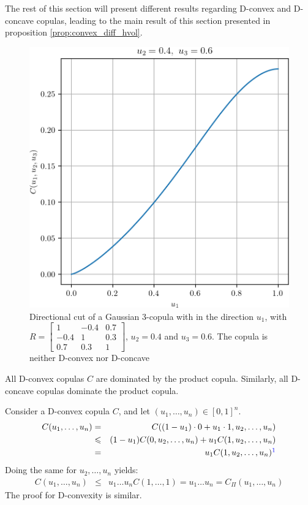 The rest of this section will present different results regarding D-convex and D-concave copulas, leading to the main result of this section presented in proposition \ref{prop:convex_diff_hvol}.

\begin{figure}
    \centering
    \includegraphics[width=0.5\linewidth]{Images/Chap_2/Gaussian_copula/gaussian_copula_n3.png}
    \caption{Directional cut of a Gaussian 3-copula with in the direction $u_1$, with $R=\begin{bmatrix} 1 & -0.4 & 0.7\\ -0.4 & 1 & 0.3\\ 0.7 & 0.3 & 1 \end{bmatrix}$, $u_2=0.4$ and $u_3=0.6$. The copula is neither D-convex nor D-concave}
    \label{fig:gaussian_copula_simu_n3}
\end{figure}

\begin{remark}
    All D-convex copulas $C$ are dominated by the product copula. Similarly, all D-concave copulas dominate the product copula.

    Consider a D-convex copula $C$, and let $(u_1, \dots, u_n)\in[0,1]^n$.
    \begin{eqnarray*}
        C(u_1,\dots, u_n) &=& C((1-u_1)\cdot0+u_1\cdot 1, u_2, \dots, u_n)\\
        &\leqslant& (1-u_1)C(0, u_2,\dots, u_n)+u_1C(1, u_2, \dots, u_n)\\
        &=& u_1C(1, u_2,\dots, u_n)\commanue{alors moi je laisserais le symbole $\leqslant$ et pas $=$}
    \end{eqnarray*}
    Doing the same for $u_2,\dots,u_n$ yields:
    \begin{eqnarray*}
        C(u_1,\dots, u_n) &\leqslant& u_1\dots u_nC(1,\dots,1) = u_1\dots u_n = C_\Pi(u_1,\dots,u_n)
    \end{eqnarray*}
    The proof for D-convexity is similar.
\end{remark}

